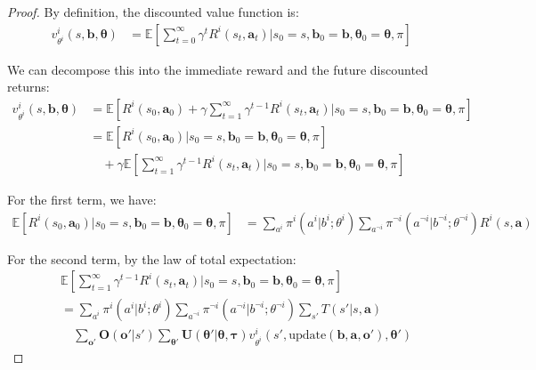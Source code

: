 \begin{proof}
    By definition, the discounted value function is:
    \begin{align}
        v^{i}_{\theta^i}(s, \boldsymbol{b}, \boldsymbol{\theta}) & = \mathbb{E}\left[ \sum_{t=0}^{\infty}\gamma^{t} R^{i}(s_{t}, \boldsymbol{a}_{t}) \bigg| s_{0}=s, \boldsymbol{b}_{0}=\boldsymbol{b}, \boldsymbol{\theta}_{0}=\boldsymbol{\theta}, \pi \right]
    \end{align}

    We can decompose this into the immediate reward and the future discounted
    returns:
    \begin{align}
        v^{i}_{\theta^i}(s, \boldsymbol{b}, \boldsymbol{\theta}) & = \mathbb{E}\left[ R^{i}(s_{0}, \boldsymbol{a}_{0}) + \gamma \sum_{t=1}^{\infty}\gamma^{t-1}R^{i}(s_{t}, \boldsymbol{a}_{t}) \bigg| s_{0}=s, \boldsymbol{b}_{0}=\boldsymbol{b}, \boldsymbol{\theta}_{0}=\boldsymbol{\theta}, \pi \right] \\
                                                                 & = \mathbb{E}\left[ R^{i}(s_{0}, \boldsymbol{a}_{0}) \bigg| s_{0}=s, \boldsymbol{b}_{0}=\boldsymbol{b}, \boldsymbol{\theta}_{0}=\boldsymbol{\theta}, \pi \right] \nonumber                                                                \\
                                                                 & \quad + \gamma \mathbb{E}\left[ \sum_{t=1}^{\infty}\gamma^{t-1}R^{i}(s_{t}, \boldsymbol{a}_{t}) \bigg| s_{0}=s, \boldsymbol{b}_{0}=\boldsymbol{b}, \boldsymbol{\theta}_{0}=\boldsymbol{\theta}, \pi \right]
    \end{align}

    For the first term, we have:
    \begin{align}
        \mathbb{E}\left[ R^{i}(s_{0}, \boldsymbol{a}_{0}) \bigg| s_{0}=s, \boldsymbol{b}_{0}=\boldsymbol{b}, \boldsymbol{\theta}_{0}=\boldsymbol{\theta}, \pi \right] & = \sum_{a^i}\pi^{i}(a^{i}|b^{i}; \theta^{i}) \sum_{a^{\neg i}}\pi^{\neg i}(a^{\neg i}|b^{\neg i}; \theta^{\neg i}) R^{i}(s, \boldsymbol{a})
    \end{align}

    For the second term, by the law of total expectation:
    \begin{align}
         & \mathbb{E}\left[ \sum_{t=1}^{\infty}\gamma^{t-1}R^{i}(s_{t}, \boldsymbol{a}_{t}) \bigg| s_{0}=s, \boldsymbol{b}_{0}=\boldsymbol{b}, \boldsymbol{\theta}_{0}=\boldsymbol{\theta}, \pi \right]                                                                                     \\
         & = \sum_{a^i}\pi^{i}(a^{i}|b^{i}; \theta^{i}) \sum_{a^{\neg i}}\pi^{\neg i}(a^{\neg i}|b^{\neg i}; \theta^{\neg i}) \sum_{s'}T(s'|s, \boldsymbol{a}) \nonumber                                                                                                                    \\
         & \quad \sum_{\boldsymbol{o}'}\boldsymbol{O}(\boldsymbol{o}'|s') \sum_{\boldsymbol{\theta}'}\boldsymbol{U}(\boldsymbol{\theta}'|\boldsymbol{\theta}, \boldsymbol{\tau}) v^{i}_{\theta^i}(s', \text{update}(\boldsymbol{b}, \boldsymbol{a}, \boldsymbol{o}'), \boldsymbol{\theta}')
    \end{align}


\end{proof}
